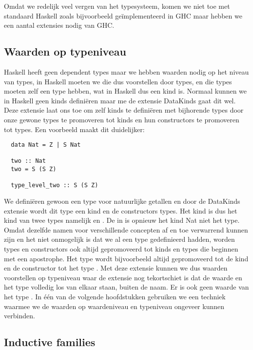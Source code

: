 Omdat we redelijk veel vergen van het typesysteem, komen we niet toe met
standaard Haskell zoals bijvoorbeeld geïmplementeerd in GHC maar hebben we een
aantal extensies nodig van GHC.

\subsection{Waarden op typeniveau}

Haskell heeft geen dependent types maar we hebben waarden nodig op het niveau
van types, in Haskell moeten we die dus voorstellen door types, en die types
moeten zelf een type hebben, wat in Haskell dus een kind is. Normaal kunnen we
in Haskell geen kinds definiëren maar me de extensie DataKinds gaat dit wel.
Deze extensie laat ons toe om zelf kinds te definiëren met bijhorende types
door onze gewone types te promoveren tot kinds en hun constructors te
promoveren tot types. Een voorbeeld maakt dit duidelijker:

\begin{verbatim}
  data Nat = Z | S Nat

  two :: Nat
  two = S (S Z)

  type_level_two :: S (S Z)
\end{verbatim}

We definiëren gewoon een type voor natuurlijke getallen en door de DataKinds
extensie wordt dit type een kind en de constructors types. Het kind 
is dus het kind van twee types namelijk  en . De
 in  is opnieuw het kind Nat niet het type. Omdat
dezelfde namen voor verschillende concepten af en toe verwarrend kunnen zijn en
het niet onmogelijk is dat we al een type  gedefinieerd hadden, worden
types en constructors ook altijd gepromoveerd tot kinds en types die beginnen
met een apostrophe. Het type  wordt bijvoorbeeld altijd gepromoveerd
tot de kind  en de constructor  tot het type .
Met deze extensie kunnen we dus waarden voorstellen op typeniveau waar de
extensie nog tekortschiet is dat de waarde  en het type 
volledig los van elkaar staan, buiten de naam. Er is ook geen waarde van het
type . In één van de volgende hoofdstukken gebruiken we een techniek
waarmee we de waarden op waardeniveau en typeniveau ongeveer kunnen verbinden.

\subsection{Inductive families}

